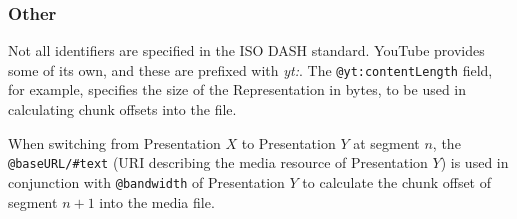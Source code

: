 \subsubsection{Other}
Not all identifiers are specified in the ISO DASH standard. YouTube
provides some of its own, and these are prefixed with \textit{yt:}.
The \texttt{@yt:contentLength} field, for example, specifies the size of the
Representation in bytes, to be used in calculating chunk offsets into the file.

When switching from Presentation $X$ to Presentation $Y$ at segment $n$, the
\texttt{@baseURL/\#text} (URI describing the media resource of Presentation $Y$)
is used in conjunction with \texttt{@bandwidth} of Presentation $Y$ to
calculate the chunk offset of segment $n+1$ into the media file.

